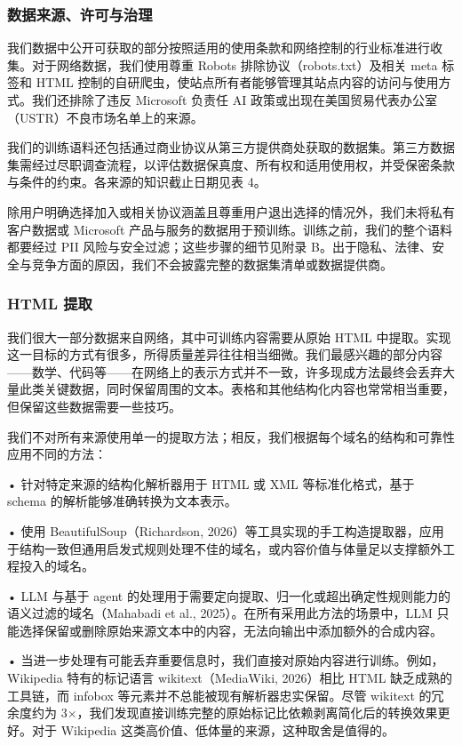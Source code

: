 \documentclass[
  10
]{article}
\begin{document}
\subsubsection{数据来源、许可与治理}\label{data-sources-licensing-and-governance}

我们数据中公开可获取的部分按照适用的使用条款和网络控制的行业标准进行收集。对于网络数据，我们使用尊重 Robots 排除协议（robots.txt）及相关 meta 标签和 HTML 控制的自研爬虫，使站点所有者能够管理其站点内容的访问与使用方式。我们还排除了违反 Microsoft 负责任 AI 政策或出现在美国贸易代表办公室（USTR）不良市场名单上的来源。

我们的训练语料还包括通过商业协议从第三方提供商处获取的数据集。第三方数据集需经过尽职调查流程，以评估数据保真度、所有权和适用使用权，并受保密条款与条件的约束。各来源的知识截止日期见表 4。

除用户明确选择加入或相关协议涵盖且尊重用户退出选择的情况外，我们未将私有客户数据或 Microsoft 产品与服务的数据用于预训练。训练之前，我们的整个语料都要经过 PII 风险与安全过滤；这些步骤的细节见附录 B。出于隐私、法律、安全与竞争方面的原因，我们不会披露完整的数据集清单或数据提供商。

\subsubsection{HTML 提取}\label{html-extraction}

我们很大一部分数据来自网络，其中可训练内容需要从原始 HTML 中提取。实现这一目标的方式有很多，所得质量差异往往相当细微。我们最感兴趣的部分内容——数学、代码等——在网络上的表示方式并不一致，许多现成方法最终会丢弃大量此类关键数据，同时保留周围的文本。表格和其他结构化内容也常常相当重要，但保留这些数据需要一些技巧。

我们不对所有来源使用单一的提取方法；相反，我们根据每个域名的结构和可靠性应用不同的方法：

• 针对特定来源的结构化解析器用于 HTML 或 XML 等标准化格式，基于 schema 的解析能够准确转换为文本表示。

• 使用 BeautifulSoup（Richardson, 2026）等工具实现的手工构造提取器，应用于结构一致但通用启发式规则处理不佳的域名，或内容价值与体量足以支撑额外工程投入的域名。

• LLM 与基于 agent 的处理用于需要定向提取、归一化或超出确定性规则能力的语义过滤的域名（Mahabadi et al., 2025）。在所有采用此方法的场景中，LLM 只能选择保留或删除原始来源文本中的内容，无法向输出中添加额外的合成内容。



• 当进一步处理有可能丢弃重要信息时，我们直接对原始内容进行训练。例如，Wikipedia 特有的标记语言 wikitext（MediaWiki, 2026）相比 HTML 缺乏成熟的工具链，而 infobox 等元素并不总能被现有解析器忠实保留。尽管 wikitext 的冗余度约为 3$\times$，我们发现直接训练完整的原始标记比依赖剥离简化后的转换效果更好。对于 Wikipedia 这类高价值、低体量的来源，这种取舍是值得的。
\end{document}
